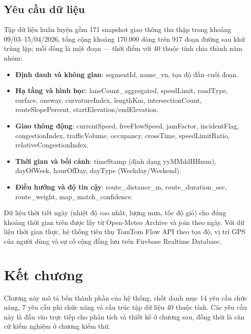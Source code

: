 \subsection{Yêu cầu dữ liệu}
Tập dữ liệu huấn luyện gồm 171 snapshot giao thông thu thập trong khoảng 09/03--15/04/2026, tổng cộng khoảng 170.000 dòng trên 917 đoạn đường sau khử trùng lặp; mỗi dòng là một đoạn --- thời điểm với 40 thuộc tính chia thành năm nhóm:
\begin{itemize}[nosep]
 \item \textbf{Định danh và không gian}: segmentId, name\_vn, tọa độ đầu--cuối đoạn.
 \item \textbf{Hạ tầng và hình học}: laneCount\_aggregated, speedLimit, roadType, surface, oneway, curvatureIndex, lengthKm, intersectionCount, routeSlopePercent, startElevation/endElevation.
 \item \textbf{Giao thông động}: currentSpeed, freeFlowSpeed, jamFactor, incidentFlag, congestionIndex, trafficVolume, occupancy, crossTime, speedLimitRatio, relativeCongestionIndex.
 \item \textbf{Thời gian và bối cảnh}: timeStamp (định dạng yyMMddHHmm), dayOfWeek, hourOfDay, dayType (Weekday/Weekend).
 \item \textbf{Điều hướng và độ tin cậy}: route\_distance\_m, route\_duration\_sec, route\_weight, map\_match\_confidence.
\end{itemize}
Dữ liệu thời tiết ngày (nhiệt độ cao nhất, lượng mưa, tốc độ gió) cho đúng khoảng thời gian trên được lấy từ Open-Meteo Archive và join theo ngày. Với dữ liệu thời gian thực, hệ thống tiêu thụ TomTom Flow API theo tọa độ, vị trí GPS của người dùng và sự cố cộng đồng lưu trên Firebase Realtime Database.

\section{Kết chương}
Chương này mô tả bốn thành phần của hệ thống, chốt danh mục 14 yêu cầu chức năng, 7 yêu cầu phi chức năng và cấu trúc tập dữ liệu 40 thuộc tính. Các yêu cầu này là đầu vào trực tiếp cho phân tích và thiết kế ở chương sau, đồng thời là căn cứ kiểm nghiệm ở chương kiểm thử.

